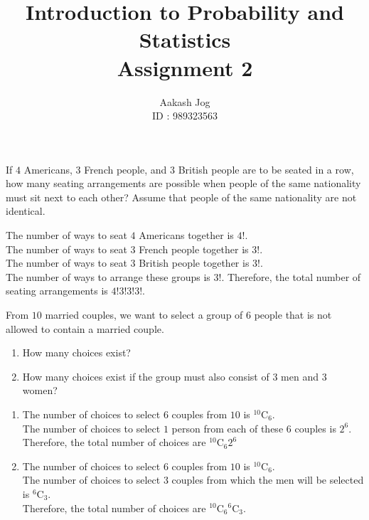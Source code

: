 \documentclass[fleqn, a4paper, 11pt, oneside]{amsart}
\title
[
	Introduction to Probability and Statistics : Assignment 2
]
{
	Introduction to Probability and Statistics\\
	Assignment 2
}
\author
{
	Aakash Jog\\
	ID : 989323563
}
\date{\formatdate{16}{3}{2016}}
\theoremstyle{definition}
\theoremstyle{theorem}
\newcommand*{\comb}[2]{{}^{#1}\mathrm{C}_{#2}}%
\begin{document}
\maketitle

\begin{question}
	If $4$ Americans, $3$ French people, and $3$ British people are to be seated in a row, how many seating arrangements are possible when people of the same nationality must sit next to each other?
	Assume that people of the same nationality are not identical.
\end{question}

\begin{solution}
	The number of ways to seat $4$ Americans together is $4!$.\\
	The number of ways to seat $3$ French people together is $3!$.\\
	The number of ways to seat $3$ British people together is $3!$.\\
	The number of ways to arrange these groups is $3!$.
	Therefore, the total number of seating arrangements is $4! 3! 3! 3!$.
\end{solution}

\begin{question}
	From $10$ married couples, we want to select a group of $6$ people that is not allowed to contain a married couple.
	\begin{enumerate}
		\item How many choices exist?
		\item How many choices exist if the group must also consist of $3$ men and $3$ women?
	\end{enumerate}
\end{question}

\begin{solution}
	\begin{enumerate}[leftmargin=*]
		\item
			The number of choices to select $6$ couples from $10$ is $\comb{10}{6}$.\\
			The number of choices to select $1$ person from each of these $6$ couples is $2^6$.\\
			Therefore, the total number of choices are $\comb{10}{6} 2^6$
		\item
			The number of choices to select $6$ couples from $10$ is $\comb{10}{6}$.\\
			The number of choices to select $3$ couples from which the men will be selected is $\comb{6}{3}$.\\
			Therefore, the total number of choices are $\comb{10}{6} \comb{6}{3}$.
	\end{enumerate}
\end{solution}
\end{document}
